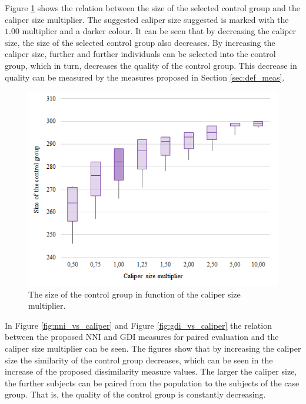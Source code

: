 										
				
		Figure \ref{fig:size_vs_caliper} shows the relation between the size of the selected control group and the caliper size multiplier. The suggested caliper size suggested is marked with the $1.00$ multiplier and a darker colour. It can be seen that by decreasing the caliper size, the size of the selected control group also decreases. By increasing the caliper size, further and further individuals can be selected into the control group, which in turn, decreases the quality of the control group. This decrease in quality can be measured by the measures proposed in Section \ref{sec:def_meas}.
						  
		\begin{figure}[h]
			\centering
			\captionsetup{justification=centering}
			\includegraphics[width=0.6\linewidth]{assets/figures/control_group_selection/measures/size_vs_caliper.png}
			\caption{The size of the control group in function of the caliper size multiplier.}
			\label{fig:size_vs_caliper}
		\end{figure}
						  
		In Figure \ref{fig:nni_vs_caliper} and Figure \ref{fig:gdi_vs_caliper} the relation between the proposed NNI and GDI measures for paired evaluation and the caliper size multiplier can be seen. The figures show that by increasing the caliper size the similarity of the control group decreases, which can be seen in the increase of the proposed dissimilarity measure values. The larger the caliper size, the further subjects can be paired from the population to the subjects of the case group. That is, the quality of the control group is constantly decreasing. %
										
